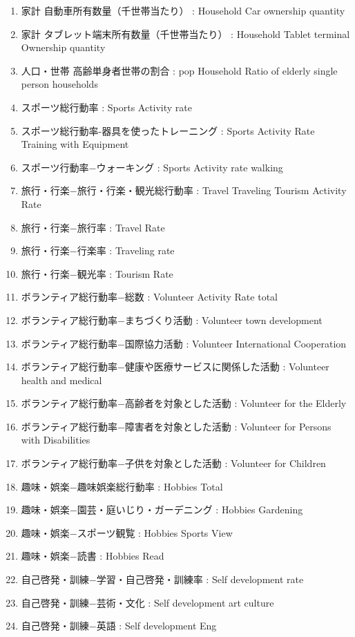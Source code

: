 \begin{enumerate}
  \item 家計 自動車所有数量（千世帯当たり）  :  Household Car ownership quantity
  \item 家計 タブレット端末所有数量（千世帯当たり）  :  Household Tablet terminal Ownership quantity
  \item 人口・世帯 高齢単身者世帯の割合  :  pop Household Ratio of elderly single person households
  \item スポーツ総行動率  :  Sports Activity rate
  \item スポーツ総行動率-器具を使ったトレーニング  :  Sports Activity Rate Training with Equipment
  \item スポーツ行動率−ウォーキング  :  Sports Activity rate walking
  \item 旅行・行楽−旅行・行楽・観光総行動率  :  Travel Traveling Tourism Activity Rate
  \item 旅行・行楽−旅行率  :  Travel Rate
  \item 旅行・行楽−行楽率  :  Traveling rate
  \item 旅行・行楽−観光率  :  Tourism Rate
  \item ボランティア総行動率−総数  :  Volunteer Activity Rate total
  \item ボランティア総行動率−まちづくり活動  :  Volunteer town development
  \item ボランティア総行動率−国際協力活動  :  Volunteer International Cooperation
  \item ボランティア総行動率−健康や医療サービスに関係した活動  :  Volunteer health and medical
  \item ボランティア総行動率−高齢者を対象とした活動  :  Volunteer for the Elderly
  \item ボランティア総行動率−障害者を対象とした活動  :  Volunteer for Persons with Disabilities
  \item ボランティア総行動率−子供を対象とした活動  :  Volunteer for Children
  \item 趣味・娯楽−趣味娯楽総行動率  :  Hobbies Total
  \item 趣味・娯楽−園芸・庭いじり・ガーデニング  :  Hobbies Gardening
  \item 趣味・娯楽−スポーツ観覧  :  Hobbies Sports View
  \item 趣味・娯楽−読書  :  Hobbies Read
  \item 自己啓発・訓練−学習・自己啓発・訓練率  :  Self development rate
  \item 自己啓発・訓練−芸術・文化  :  Self development art culture
  \item 自己啓発・訓練−英語  :  Self development Eng

\end{enumerate}
